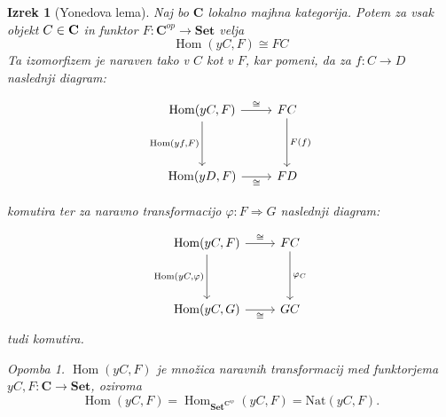 \documentclass[12pt,a4paper]{book}
\theoremstyle{definition}
\theoremstyle{plain}
\newtheorem{izrek}[definicija]{Izrek}
\theoremstyle{definition}
\theoremstyle{remark}
\newtheorem*{opomba}{Opomba}
\newcommand{\cat}[1]{\textbf{#1}}
\DeclareMathOperator{\Hom}{Hom}
\begin{document}
\begin{izrek}[Yonedova lema]
Naj bo $\cat{C}$ lokalno majhna kategorija. Potem za vsak objekt $C \in \bf{C}$ in funktor $F : \cat{C}^{op} \to \cat{Set}$ velja
$$\Hom(yC,F) \cong FC$$
Ta izomorfizem je naraven tako v $C$ kot v $F$, kar pomeni, da za $f : C \to D$ naslednji diagram:

\begin{equation} \label{diag1}
\begin{tikzcd}[row sep=huge]
\Hom(yC,F) \arrow[r, "\cong"] \arrow[d, "{\Hom(yf,F)}"'] & FC \arrow[d, "F(f)"] \\
\Hom(yD,F) \arrow[r, "\cong"'] & FD
\end{tikzcd}
\end{equation}


komutira ter za naravno transformacijo $\varphi : F \Rightarrow G$ naslednji diagram:

\begin{equation} \label{diag2}
\begin{tikzcd}[row sep=huge]
\Hom(yC,F) \arrow[r, "\cong"] \arrow[d, "{\Hom(yC,}\varphi\text{)}"'] & FC \arrow[d, "\varphi_C"] \\
\Hom(yC,G) \arrow[r, "\cong"']	&	GC
\end{tikzcd}
\end{equation}
tudi komutira.

\begin{opomba}
 $\Hom(yC,F)$ je množica naravnih transformacij med funktorjema $yC,F : \cat{C} \to \cat{Set}$, oziroma 
 $$\Hom(yC,F) = \Hom_{\cat{Set}^{\cat{C}^{op}}}(yC,F) = \mathrm{Nat}(yC,F).$$
\end{opomba}

\end{izrek}
\end{document}
